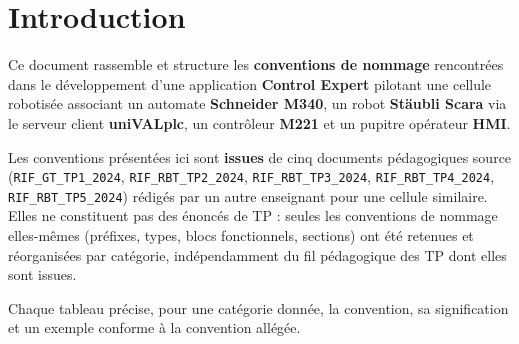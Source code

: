 \section{Introduction}
\label{secIntroduction}

Ce document rassemble et structure les \textbf{conventions de nommage} rencontrées dans le
développement d'une application \textbf{Control Expert} pilotant une cellule robotisée
associant un automate \textbf{Schneider M340}, un robot \textbf{Stäubli Scara} via le serveur
client \textbf{uniVALplc}, un contrôleur \textbf{M221} et un pupitre opérateur \textbf{HMI}.

Les conventions présentées ici sont \textbf{issues} de cinq documents
pédagogiques source (\texttt{RIF\_GT\_TP1\_2024}, \texttt{RIF\_RBT\_TP2\_2024},
\texttt{RIF\_RBT\_TP3\_2024}, \texttt{RIF\_RBT\_TP4\_2024}, \texttt{RIF\_RBT\_TP5\_2024}) rédigés
par un autre enseignant pour une cellule similaire. Elles ne constituent pas des énoncés de TP :
seules les conventions de nommage elles-mêmes (préfixes, types, blocs fonctionnels, sections)
ont été retenues et réorganisées par catégorie, indépendamment du fil pédagogique des TP dont
elles sont issues.


\medskip
Chaque tableau précise, pour une catégorie donnée, la convention, sa signification et un exemple
conforme à la convention allégée.
